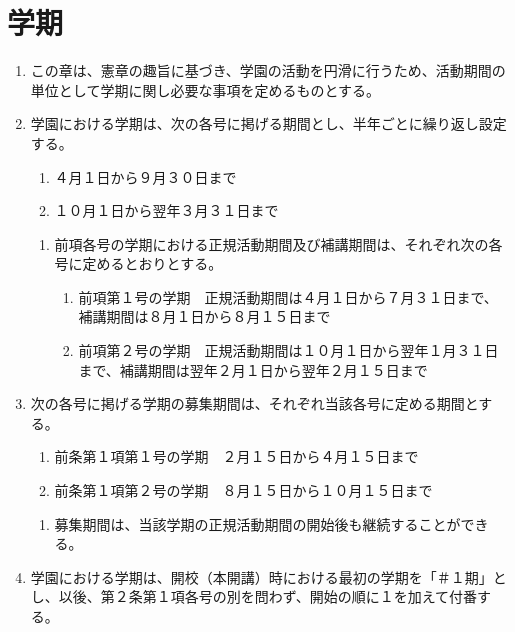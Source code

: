 \newpage
\chapter{学期}
\begin{enumerate}[label=第\arabic*条　]
  \item この章は、憲章の趣旨に基づき、学園の活動を円滑に行うため、活動期間の単位として学期に関し必要な事項を定めるものとする。
  \item 学園における学期は、次の各号に掲げる期間とし、半年ごとに繰り返し設定する。
      \begin{enumerate}[label=(\arabic*)　]
        \item ４月１日から９月３０日まで
        \item １０月１日から翌年３月３１日まで
      \end{enumerate}
    \begin{enumerate}[label=\arabic*　,start=2,leftmargin=*]
      \item 前項各号の学期における正規活動期間及び補講期間は、それぞれ次の各号に定めるとおりとする。
        \begin{enumerate}[label=(\arabic*)　]
          \item 前項第１号の学期　正規活動期間は４月１日から７月３１日まで、補講期間は８月１日から８月１５日まで
          \item 前項第２号の学期　正規活動期間は１０月１日から翌年１月３１日まで、補講期間は翌年２月１日から翌年２月１５日まで
        \end{enumerate}
    \end{enumerate}
  \item 次の各号に掲げる学期の募集期間は、それぞれ当該各号に定める期間とする。
      \begin{enumerate}[label=(\arabic*)　]
        \item 前条第１項第１号の学期　２月１５日から４月１５日まで
        \item 前条第１項第２号の学期　８月１５日から１０月１５日まで
      \end{enumerate}
    \begin{enumerate}[label=\arabic*　,start=2,leftmargin=*]
      \item 募集期間は、当該学期の正規活動期間の開始後も継続することができる。
    \end{enumerate}
  \item 学園における学期は、開校（本開講）時における最初の学期を「＃１期」とし、以後、第２条第１項各号の別を問わず、開始の順に１を加えて付番する。
    \begin{enumerate}[label=\arabic*　,start=2,leftmargin=*]

\end{enumerate}
\end{enumerate}
